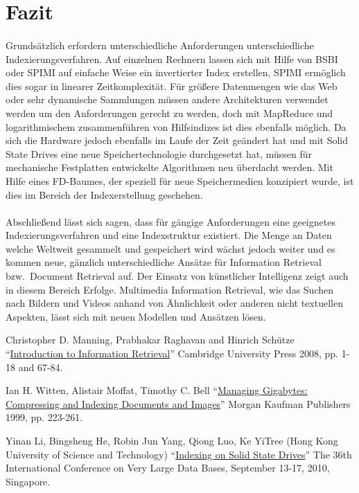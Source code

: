 \section{Fazit}
\paragraph{}
Grundsätzlich erfordern unterschiedliche Anforderungen unterschiedliche Indexierungsverfahren. Auf einzelnen Rechnern lassen sich mit Hilfe von BSBI oder SPIMI auf einfache Weise ein invertierter Index erstellen, SPIMI ermöglich dies sogar in linearer Zeitkomplexität. Für größere Datenmengen wie das Web oder sehr dynamische Sammlungen müssen andere Architekturen verwendet werden um den Anforderungen gerecht zu werden, doch mit MapReduce und logarithmischem zusammenführen von Hilfsindizes ist dies ebenfalls möglich. Da sich die Hardware jedoch ebenfalls im Laufe der Zeit geändert hat und mit Solid State Drives eine neue Speichertechnologie durchgesetzt hat, müssen für mechanische Festplatten entwickelte Algorithmen neu überdacht werden. Mit Hilfe eines FD-Baumes, der speziell für neue Speichermedien konzipiert wurde, ist dies im Bereich der Indexerstellung geschehen.\par

\paragraph{}
Abschließend lässt sich sagen, dass für gängige Anforderungen eine geeignetes Indexierungsverfahren und eine Indexstruktur existiert. Die Menge an Daten welche Weltweit gesammelt und gespeichert wird wächst jedoch weiter und es kommen neue, gänzlich unterschiedliche Ansätze für Information Retrieval bzw.\ Document Retrieval auf. Der Einsatz von künstlicher Intelligenz zeigt auch in diesem Bereich Erfolge. Multimedia Information Retrieval, wie das Suchen nach Bildern und Videos anhand von Ähnlichkeit oder anderen nicht textuellen Aspekten, lässt sich mit neuen Modellen und Ansätzen lösen.
\par

\begin{thebibliography}{9}

		Christopher D. Manning, Prabhakar Raghavan and Hinrich Schütze \enquote{\href{https://nlp.stanford.edu/IR-book/pdf/04const.pdf}{Introduction to Information Retrieval}}  Cambridge University Press 2008, pp. 1-18 and 67-84.

	  Ian H. Witten, Alistair Moffat, Timothy C. Bell \enquote{\href{https://books.google.de/books?id=2F74jyPl48EC&dq=Witten+et+al.+index+1999&lr=&hl=de&source=gbs_navlinks_s}{Managing Gigabytes: Compressing and Indexing Documents and Images}}  Morgan Kaufman Publishers 1999, pp. 223-261.
	
	Yinan Li, Bingsheng He, Robin Jun Yang, Qiong Luo, Ke YiTree (Hong Kong University of Science and Technology) \enquote{\href{http://pages.cs.wisc.edu/~yinan/paper/fdtree_pvldb.pdf}{Indexing on Solid State Drives}} The 36th International Conference on Very Large Data Bases, September 13-17,
2010, Singapore.
\end{thebibliography}

